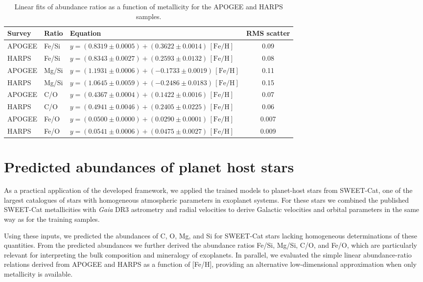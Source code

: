 \documentclass{aa}
\begin{document}
\begin{table}
\caption{Linear fits of abundance ratios as a function of metallicity for the APOGEE and HARPS samples.}
\label{tab:ratio_slopes_rms}
\centering
\small
\begin{tabular}{lllc}
\hline\hline
Survey & Ratio & Equation & RMS scatter \\
\hline
APOGEE & Fe/Si & $y = (0.8319 \pm 0.0005) + (0.3622 \pm 0.0014)\,[\mathrm{Fe/H}]$ & 0.09 \\
HARPS & Fe/Si & $y = (0.8343 \pm 0.0027) + (0.2593 \pm 0.0132)\,[\mathrm{Fe/H}]$ & 0.08 \\
APOGEE & Mg/Si & $y = (1.1931 \pm 0.0006) + (-0.1733 \pm 0.0019)\,[\mathrm{Fe/H}]$ & 0.11 \\
HARPS & Mg/Si & $y = (1.0645 \pm 0.0059) + (-0.2486 \pm 0.0183)\,[\mathrm{Fe/H}]$ & 0.15 \\
APOGEE & C/O & $y = (0.4367 \pm 0.0004) + (0.1422 \pm 0.0016)\,[\mathrm{Fe/H}]$ & 0.07 \\
HARPS & C/O & $y = (0.4941 \pm 0.0046) + (0.2405 \pm 0.0225)\,[\mathrm{Fe/H}]$ & 0.06 \\
APOGEE & Fe/O & $y = (0.0500 \pm 0.0000) + (0.0290 \pm 0.0001)\,[\mathrm{Fe/H}]$ & 0.007 \\
HARPS & Fe/O & $y = (0.0541 \pm 0.0006) + (0.0475 \pm 0.0027)\,[\mathrm{Fe/H}]$ & 0.009 \\
\hline
\end{tabular}
\end{table}

\section{Predicted abundances of planet host stars}

As a practical application of the developed framework, we applied the trained models to planet-host stars from SWEET-Cat, one of the largest catalogues of stars with homogeneous atmospheric parameters in exoplanet systems. For these stars we combined the published SWEET-Cat metallicities with \textit{Gaia} DR3 astrometry and radial velocities to derive Galactic velocities and orbital parameters in the same way as for the training samples.

Using these inputs, we predicted the abundances of C, O, Mg, and Si for SWEET-Cat stars lacking homogeneous determinations of these quantities. From the predicted abundances we further derived the abundance ratios Fe/Si, Mg/Si, C/O, and Fe/O, which are particularly relevant for interpreting the bulk composition and mineralogy of exoplanets. In parallel, we evaluated the simple linear abundance-ratio relations derived from APOGEE and HARPS as a function of [Fe/H], providing an alternative low-dimensional approximation when only metallicity is available.
\end{document}
